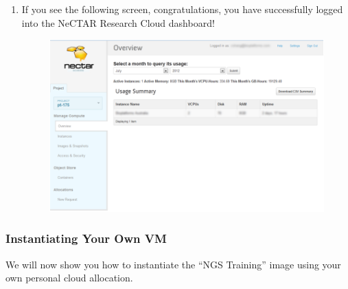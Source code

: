 \begin{enumerate}
\begin{figure}[H]
    \label{fig:aaf_home_institute}
  \end{figure}
  \item If you see the following screen, congratulations, you have
  successfully logged into the NeCTAR Research Cloud dashboard!
  \begin{figure}[H]
    \centering
    \includegraphics[scale=0.5]{post-workshop/nectar/dashboard_overview.png}
    \label{fig:dashboard_overview}
  \end{figure}
\end{enumerate}

\subsubsection{Instantiating Your Own VM}
We will now show you how to instantiate the ``NGS Training'' image using your
own personal cloud allocation.

